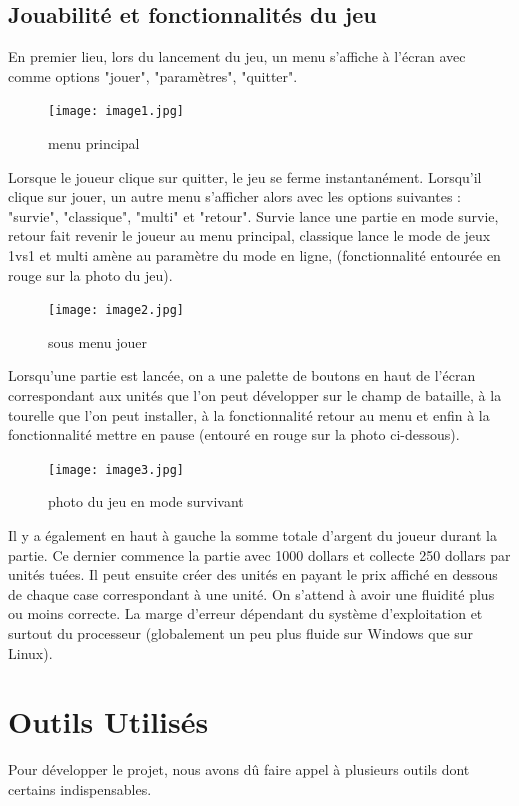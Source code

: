\documentclass[a4paper,11pt]{article}
\begin{document}
\subsection {Jouabilité et fonctionnalités du jeu}
En premier lieu, lors du lancement du jeu, un menu s'affiche à l'écran avec comme options "jouer", "paramètres", "quitter".
\begin{figure}[ht!]
\centering
\texttt{[image: image1.jpg]} 
\caption {\label{image2} menu principal}
\end{figure}
 \smallbreak
Lorsque le joueur clique sur quitter, le jeu se ferme instantanément. Lorsqu'il clique sur jouer, un autre menu s'afficher alors 
avec les options suivantes : "survie", "classique", "multi" et "retour". 
Survie lance une partie en mode survie, retour fait revenir le joueur au menu principal, classique lance le mode de jeux 1vs1 et multi amène au paramètre du mode en ligne, (fonctionnalité entourée en rouge sur la photo du jeu).
\begin{figure}[ht!]
\centering
\texttt{[image: image2.jpg]} 
\caption {\label{image3} sous menu jouer}
\end{figure}
 \smallbreak
Lorsqu'une partie est lancée, on a une palette de boutons en haut de l'écran correspondant aux unités que l'on peut développer sur le champ de bataille, à la tourelle
que l'on peut installer, à la fonctionnalité retour au menu et enfin à la fonctionnalité mettre en pause (entouré en rouge sur la photo ci-dessous).
\begin{figure}[ht!]
\centering
\texttt{[image: image3.jpg]} 
\caption {\label{image4} photo du jeu en mode survivant}
\end{figure}
 \smallbreak
Il y a également en haut à gauche la somme totale d'argent du joueur durant la partie. Ce dernier commence la partie avec 1000 dollars et collecte 250 dollars par unités tuées. Il peut ensuite créer des unités en payant le prix affiché en dessous de chaque case correspondant à une unité. On s'attend à avoir une fluidité plus ou moins correcte. La marge d'erreur dépendant du système d'exploitation et surtout du processeur (globalement un peu plus fluide sur Windows que sur Linux). \\

\section {Outils Utilisés}

Pour développer le projet, nous avons dû faire appel à plusieurs outils dont certains indispensables.
\end{document}
